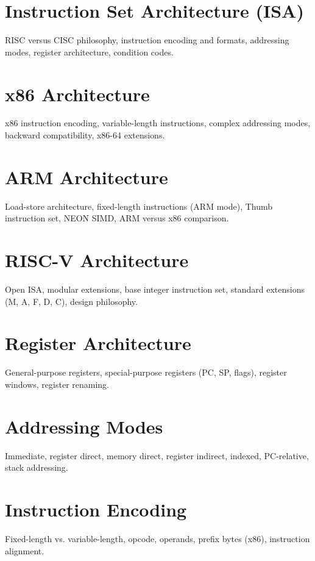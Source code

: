 
\chapter{Instruction Set Architecture (ISA)}
RISC versus CISC philosophy, instruction encoding and formats, addressing modes, register architecture, condition codes.

\chapter{x86 Architecture}
x86 instruction encoding, variable-length instructions, complex addressing modes, backward compatibility, x86-64 extensions.

\chapter{ARM Architecture}
Load-store architecture, fixed-length instructions (ARM mode), Thumb instruction set, NEON SIMD, ARM versus x86 comparison.

\chapter{RISC-V Architecture}
Open ISA, modular extensions, base integer instruction set, standard extensions (M, A, F, D, C), design philosophy.

\chapter{Register Architecture}
General-purpose registers, special-purpose registers (PC, SP, flags), register windows, register renaming.

\chapter{Addressing Modes}
Immediate, register direct, memory direct, register indirect, indexed, PC-relative, stack addressing.

\chapter{Instruction Encoding}
Fixed-length vs. variable-length, opcode, operands, prefix bytes (x86), instruction alignment.

